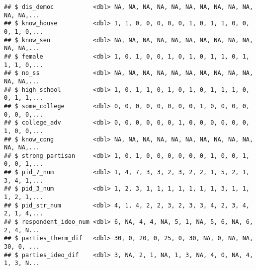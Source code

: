 \documentclass[
]{article}
\begin{document}
\begin{verbatim}
## $ dis_democ           <dbl> NA, NA, NA, NA, NA, NA, NA, NA, NA, NA, NA, NA,...
## $ know_house          <dbl> 1, 1, 0, 0, 0, 0, 0, 1, 0, 1, 1, 0, 0, 0, 1, 0,...
## $ know_sen            <dbl> NA, NA, NA, NA, NA, NA, NA, NA, NA, NA, NA, NA,...
## $ female              <dbl> 1, 0, 1, 0, 0, 1, 0, 1, 0, 1, 1, 0, 1, 1, 1, 0,...
## $ no_ss               <dbl> NA, NA, NA, NA, NA, NA, NA, NA, NA, NA, NA, NA,...
## $ high_school         <dbl> 1, 0, 1, 1, 0, 1, 0, 1, 0, 1, 1, 1, 0, 0, 1, 1,...
## $ some_college        <dbl> 0, 0, 0, 0, 0, 0, 0, 0, 1, 0, 0, 0, 0, 0, 0, 0,...
## $ college_adv         <dbl> 0, 0, 0, 0, 0, 0, 1, 0, 0, 0, 0, 0, 0, 1, 0, 0,...
## $ know_cong           <dbl> NA, NA, NA, NA, NA, NA, NA, NA, NA, NA, NA, NA,...
## $ strong_partisan     <dbl> 1, 0, 1, 0, 0, 0, 0, 0, 0, 1, 0, 0, 1, 0, 0, 1,...
## $ pid_7_num           <dbl> 1, 4, 7, 3, 3, 2, 3, 2, 2, 1, 5, 2, 1, 3, 4, 1,...
## $ pid_3_num           <dbl> 1, 2, 3, 1, 1, 1, 1, 1, 1, 1, 3, 1, 1, 1, 2, 1,...
## $ pid_str_num         <dbl> 4, 1, 4, 2, 2, 3, 2, 3, 3, 4, 2, 3, 4, 2, 1, 4,...
## $ respondent_ideo_num <dbl> 6, NA, 4, 4, NA, 5, 1, NA, 5, 6, NA, 6, 2, 4, N...
## $ parties_therm_dif   <dbl> 30, 0, 20, 0, 25, 0, 30, NA, 0, NA, NA, 30, 0, ...
## $ parties_ideo_dif    <dbl> 3, NA, 2, 1, NA, 1, 3, NA, 4, 0, NA, 4, 1, 3, N...
\end{verbatim}
\end{document}
